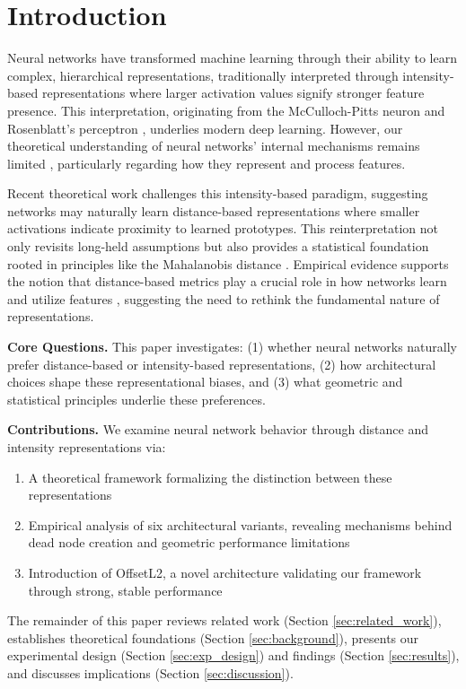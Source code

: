 \section{Introduction}
\label{sec:introduction}

Neural networks have transformed machine learning through their ability to learn complex, hierarchical representations, traditionally interpreted through intensity-based representations where larger activation values signify stronger feature presence. This interpretation, originating from the McCulloch-Pitts neuron \cite{mcculloch1943logical} and Rosenblatt's perceptron \cite{rosenblatt1958perceptron}, underlies modern deep learning. However, our theoretical understanding of neural networks' internal mechanisms remains limited \cite{lipton2018mythos}, particularly regarding how they represent and process features.

Recent theoretical work challenges this intensity-based paradigm, suggesting networks may naturally learn distance-based representations \cite{oursland2024interpreting} where smaller activations indicate proximity to learned prototypes. This reinterpretation not only revisits long-held assumptions but also provides a statistical foundation rooted in principles like the Mahalanobis distance \cite{mahalanobis1936generalized}. Empirical evidence supports the notion that distance-based metrics play a crucial role in how networks learn and utilize features \cite{oursland2024neural}, suggesting the need to rethink the fundamental nature of representations.

\textbf{Core Questions.} This paper investigates: (1) whether neural networks naturally prefer distance-based or intensity-based representations, (2) how architectural choices shape these representational biases, and (3) what geometric and statistical principles underlie these preferences.

\textbf{Contributions.} We examine neural network behavior through distance and intensity representations via:
\begin{enumerate}
    \item A theoretical framework formalizing the distinction between these representations
    \item Empirical analysis of six architectural variants, revealing mechanisms behind dead node creation and geometric performance limitations
    \item Introduction of OffsetL2, a novel architecture validating our framework through strong, stable performance
\end{enumerate}

The remainder of this paper reviews related work (Section \ref{sec:related_work}), establishes theoretical foundations (Section \ref{sec:background}), presents our experimental design (Section \ref{sec:exp_design}) and findings (Section \ref{sec:results}), and discusses implications (Section \ref{sec:discussion}).
